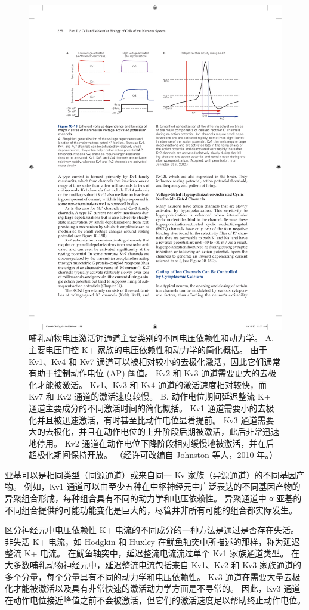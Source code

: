 \begin{figure}[htbp]
	\centering
	\includegraphics[width=0.8\linewidth]{chap10/fig_10_13}
	\caption{哺乳动物电压激活钾通道主要类别的不同电压依赖性和动力学。 A. 主要电压门控 K+ 家族的电压依赖性和动力学的简化概括。 由于 Kv1、Kv4 和 Kv7 通道可以被相对较小的去极化激活，因此它们通常有助于控制动作电位 (AP) 阈值。 Kv2 和 Kv3 通道需要更大的去极化才能被激活。 Kv1、Kv3 和 Kv4 通道的激活速度相对较快，而 Kv7 和 Kv2 通道的激活速度较慢。 B. 动作电位期间延迟整流 K+ 通道主要成分的不同激活时间的简化概括。 Kv1 通道需要小的去极化并且被迅速激活，有时甚至比动作电位显着提前。 Kv3 通道需要大的去极化，并且在动作电位的上升阶段后期被激活，此后非常迅速地停用。 Kv2 通道在动作电位下降阶段相对缓慢地被激活，并在后超极化期间保持开放。 （经许可改编自 Johnston 等人，2010 年。）}
	\label{fig:10_13}
\end{figure}


亚基可以是相同类型（同源通道）或来自同一 Kv 家族（异源通道）的不同基因产物。 
例如，Kv1 通道可以由至少五种在中枢神经元中广泛表达的不同基因产物的异聚组合形成，每种组合具有不同的动力学和电压依赖性。 
异聚通道中 α 亚基的不同组合提供的可能功能变化是巨大的，尽管并非所有可能的组合都实际发生。


区分神经元中电压依赖性 K+ 电流的不同成分的一种方法是通过是否存在失活。 
非失活 K+ 电流，如 Hodgkin 和 Huxley 在鱿鱼轴突中所描述的那样，称为延迟整流 K+ 电流。 
在鱿鱼轴突中，延迟整流电流流过单个 Kv1 家族通道类型。 
在大多数哺乳动物神经元中，延迟整流电流包括来自 Kv1、Kv2 和 Kv3 家族通道的多个分量，每个分量具有不同的动力学和电压依赖性。 
Kv3 通道在需要大量去极化才能被激活以及具有非常快速的激活动力学方面是不寻常的。 
因此，Kv3 通道在动作电位接近峰值之前不会被激活，但它们的激活速度足以帮助终止动作电位。


